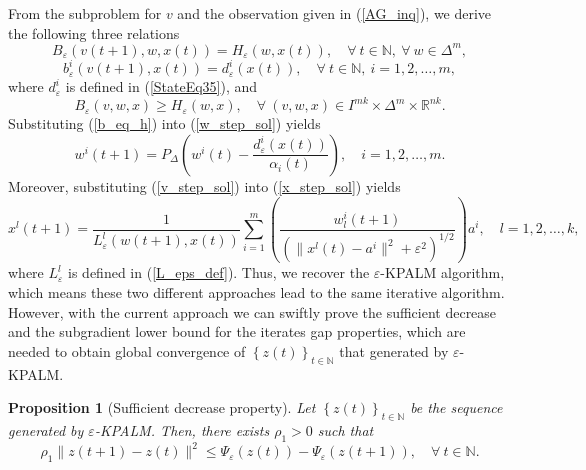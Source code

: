 \documentclass[12pt]{article}
\numberwithin{equation}{section}
\newtheorem{proposition}{Proposition}[section]
\newcommand{\nn}{\mathbb{N}} %
\newcommand{\rr}{\mathbb{R}} %
\begin{document}
From the subproblem for $v$ and the observation given in (\ref{AG_inq}), we derive the following three relations
\begin{equation}
	B_{\varepsilon}(v(t+1),w,x(t)) = H_{\varepsilon}(w,x(t)), \quad \forall \: t \in \nn, \: \forall \: w \in \Delta^{m} , \label{B_eq_H}
\end{equation}
\begin{equation}
	b^i_{\varepsilon}(v(t+1),x(t)) = d^i_{\varepsilon}(x(t)), \quad \forall \: t \in \nn, \: i=1,2,\ldots,m , \label{b_eq_h}
\end{equation}
where $d^i_{\varepsilon}$ is defined in (\ref{StateEq35}), and
\begin{equation}
	B_{\varepsilon}(v,w,x) \geq H_{\varepsilon}(w,x), \quad \forall \: (v,w,x) \in I^{mk} \times \Delta^{m} \times \rr^{nk} . \label{B_geq_H}
\end{equation}
Substituting (\ref{b_eq_h}) into (\ref{w_step_sol}) yields
\begin{equation*}
	w^i(t+1) = P_{\Delta}\left( w^i(t) - \frac{d^i_{\varepsilon}(x(t))}{\alpha_i(t)} \right), \quad i=1,2,\ldots,m . 
\end{equation*}
Moreover, substituting (\ref{v_step_sol}) into (\ref{x_step_sol}) yields
\begin{equation*}
	x^l(t+1) = \frac{1}{L^l_{\varepsilon}(w(t+1),x(t))} \sum\limits_{i=1}^{m} \left( \frac{w^i_l(t+1)}{\left( \|x^l(t) - a^i\|^2 + {\varepsilon}^2 \right)^{1/2}} \right) a^i, \quad l=1,2,\ldots,k ,
\end{equation*}
where $L^l_{\varepsilon}$ is defined in (\ref{L_eps_def}). Thus, we recover the $\varepsilon$-KPALM algorithm, which means these two different approaches lead to the same iterative algorithm. However, with the current approach we can swiftly prove the sufficient decrease and the subgradient lower bound for the iterates gap properties, which are needed to obtain global convergence of $\left\lbrace z(t) \right\rbrace_{t \in \mathbb{N}}$ that generated by $\varepsilon$-KPALM.

\begin{proposition}[Sufficient decrease property]
Let $\left\lbrace z(t) \right\rbrace_{t \in \mathbb{N}}$ be the sequence generated by $\varepsilon$-KPALM. Then, there exists $\rho_1 > 0$ such that 
\begin{equation*}
	\rho_1 \|z(t+1) - z(t)\|^2 \leq \Psi_{\varepsilon}(z(t)) - \Psi_{\varepsilon}(z(t+1)), \quad \forall \: t \in \mathbb{N} .
\end{equation*}
\end{proposition}
\end{document}
